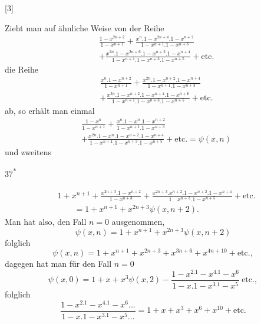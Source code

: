\begingroup
\makeatletter\tagsleft@true\let\veqno\@@leqno\makeatother
{}
\par\medskip{}\begin{center}[3]\end{center}
\par\indent Zieht man auf ähnliche Weise von der Reihe
\[\begin{aligned}
&\frac{1-x^{2n+2}}{1-x^{n+1}}+\frac{x^n.1-x^{2n+4}.1-x^{n+2}}{1-x^{n+1}.1-x^{n+3}}\\
&+\frac{x^{2n}.1-x^{2n+6}.1-x^{n+2}.1-x^{n+4}}{1-x^{n+1}.1-x^{n+3}.1-x^{n+5}}+\text{etc.}
\end{aligned}\]
\noindent die Reihe
\[\begin{aligned}
&\frac{x^n.1-x^{n+2}}{1-x^{n+1}}+\frac{x^{2n}.1-x^{n+2}.1-x^{n+4}}{1-x^{n+1}.1-x^{n+3}}\\
&+\frac{x^{3n}.1-x^{n+2}.1-x^{n+4}.1-x^{n+6}}{1-x^{n+1}.1-x^{n+3}.1-x^{n+5}}+\text{etc.}
\end{aligned}\]
\noindent ab, so erhält man einmal
\[\begin{aligned}
&\frac{1-x^n}{1-x^{n+1}}+\frac{x^n.1-x^n.1-x^{n+2}}{1-x^{n+1}.1-x^{n+3}}\\
&+\frac{x^{2n}.1-x^n.1-x^{n+2}.1-x^{n+4}}{1-x^{n+1}.1-x^{n+3}.1-x^{n+5}}+\text{etc.}=\psi(x,n)
\end{aligned}\]
\noindent und zweitens
\par\smallskip\hfill 37\textsuperscript{*}\par
\clearpage
{}
\[\begin{aligned}
&1+x^{n+1}+\frac{x^{2n+3}.1-x^{n+2}}{1-x^{n+3}}
+\frac{x^{2n+3}.x^{n+2}.1-x^{n+2}.1-x^{n+4}}{1\quad x^{n+3}.1-x^{n+5}}+\text{etc.}\\
&\hspace{2em}=1+x^{n+1}+x^{2n+3}\psi(x,n+2).
\end{aligned}\]
\noindent Man hat also, den Fall $n=0$ ausgenommen,
\[\psi(x,n)=1+x^{n+1}+x^{2n+3}\psi(x,n+2)\]
\noindent folglich
\[\psi(x,n)=1+x^{n+1}+x^{2n+3}+x^{3n+6}+x^{4n+10}+\text{etc.},\]
\noindent dagegen hat man für den Fall $n=0$
\[\psi(x,0)=1+x+x^3\psi(x,2)-\frac{1-x^2.1-x^4.1-x^6}{1-x.1-x^3.1-x^5}\ \text{etc.},\]
\noindent folglich
\begin{equation*}\tag*{[2]}
\frac{1-x^2.1-x^4.1-x^6{.}{.}{.}}{1-x.1-x^3.1-x^5{.}{.}{.}}=1+x+x^3+x^6+x^{10}+\text{etc.}
\end{equation*}
\clearpage
\endgroup
